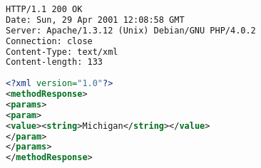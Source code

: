 \begin{lstlisting}[language=XML, caption=Przykład odpowiedzi serwera]
HTTP/1.1 200 OK  
Date: Sun, 29 Apr 2001 12:08:58 GMT  
Server: Apache/1.3.12 (Unix) Debian/GNU PHP/4.0.2  
Connection: close  
Content-Type: text/xml  
Content-length: 133 
 
<?xml version="1.0"?> 
<methodResponse> 
<params> 
<param> 
<value><string>Michigan</string></value> 
</param> 
</params> 
</methodResponse> 
\end{lstlisting}